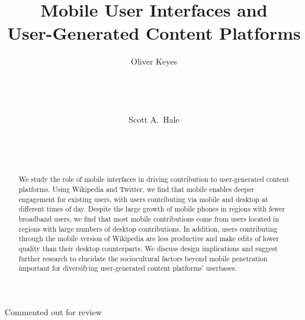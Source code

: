 \documentclass{sigchi}
\begin{document}
\title{Mobile User Interfaces and\\User-Generated Content Platforms}

Commented out for review
\author{
  \alignauthor Oliver Keyes\\
    \\
    \\
    \\
    \\
  \alignauthor Scott A.~Hale\\
    \\
    \\
    \\
}

\maketitle

\begin{abstract}
We study the role of mobile interfaces in driving contribution to user-generated content platforms. Using Wikipedia and Twitter, we find that mobile enables deeper engagement for existing users, with users contributing via mobile and desktop at different times of day. Despite the large growth of mobile phones in regions with fewer broadband users, we find that most mobile contributions come from users located in regions with large numbers of desktop contributions. In addition, users contributing through the mobile version of Wikipedia
are less productive and make edits of lower quality than their desktop counterparts. We discuss design implications and suggest further research to elucidate the sociocultural factors beyond mobile penetration important for diversifying user-generated content platforms' userbases.
\end{abstract}




\end{document}
